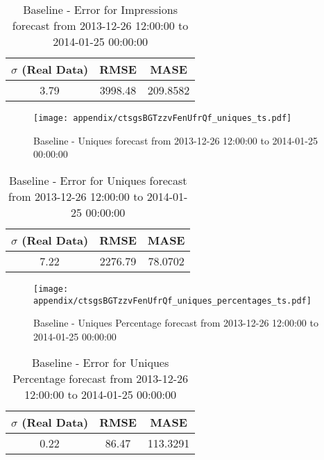\begin{table}[H]
\centering
\footnotesize
\begin{tabular}{ccc}
$\sigma$ (Real Data) & RMSE & MASE   \\ \hline
3.79 & 3998.48 & 209.8582 \\
\end{tabular}

\vspace{0.5cm}

\caption{
Baseline - Error for Impressions forecast from 2013-12-26 12:00:00 to 2014-01-25 00:00:00}
\end{table}

\begin{figure}[H] \begin{center} \leavevmode
\texttt{[image: appendix/ctsgsBGTzzvFenUfrQf\_uniques\_ts.pdf]} \caption{
Baseline - Uniques forecast from 2013-12-26 12:00:00 to 2014-01-25 00:00:00} \label{fig:appendix/ctsgsBGTzzvFenUfrQf_uniques_ts.pdf} \end{center}
\end{figure}

\begin{table}[H]
\centering
\footnotesize
\begin{tabular}{ccc}
$\sigma$ (Real Data) & RMSE & MASE   \\ \hline
7.22 & 2276.79 & 78.0702 \\
\end{tabular}

\vspace{0.5cm}

\caption{
Baseline - Error for Uniques forecast from 2013-12-26 12:00:00 to 2014-01-25 00:00:00}
\end{table}

\begin{figure}[H] \begin{center} \leavevmode
\texttt{[image: appendix/ctsgsBGTzzvFenUfrQf\_uniques\_percentages\_ts.pdf]} \caption{
Baseline - Uniques Percentage forecast from 2013-12-26 12:00:00 to 2014-01-25 00:00:00} \label{fig:appendix/ctsgsBGTzzvFenUfrQf_uniques_percentages_ts.pdf} \end{center}
\end{figure}

\begin{table}[H]
\centering
\footnotesize
\begin{tabular}{ccc}
$\sigma$ (Real Data) & RMSE & MASE   \\ \hline
0.22 & 86.47 & 113.3291 \\
\end{tabular}

\vspace{0.5cm}

\caption{
Baseline - Error for Uniques Percentage forecast from 2013-12-26 12:00:00 to 2014-01-25 00:00:00}
\end{table}

